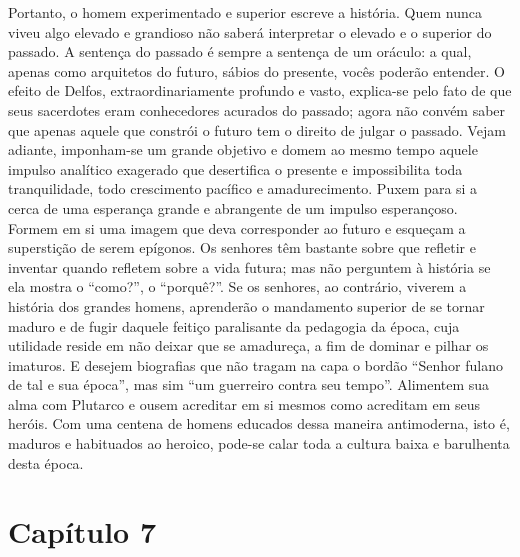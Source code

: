 Portanto, o homem experimentado e superior escreve a história. Quem
nunca viveu algo elevado e grandioso não saberá interpretar o elevado e
o superior do passado. A sentença do passado é sempre a sentença de um
oráculo: a qual, apenas como arquitetos do futuro, sábios do presente,
vocês poderão entender. O efeito de Delfos, extraordinariamente profundo
e vasto, explica-se pelo fato de que seus sacerdotes eram conhecedores
acurados do passado; agora não convém saber que apenas aquele que
constrói o futuro tem o direito de julgar o passado. Vejam adiante,
imponham-se um grande objetivo e domem ao mesmo tempo aquele impulso
analítico exagerado que desertifica o presente e impossibilita toda
tranquilidade, todo crescimento pacífico e amadurecimento. Puxem para si
a cerca de uma esperança grande e abrangente de um impulso esperançoso.
Formem em si uma imagem que deva corresponder ao futuro e esqueçam a
superstição de serem epígonos. Os senhores têm bastante sobre que refletir
e inventar quando refletem sobre a vida futura; mas não perguntem à
história se ela mostra o ``como?'', o ``porquê?''. Se os senhores, ao
contrário, viverem a história dos grandes homens, aprenderão o
mandamento superior de se tornar maduro e de fugir daquele feitiço
paralisante da pedagogia da época, cuja utilidade reside em não deixar
que se amadureça, a fim de dominar e pilhar os imaturos. E desejem
biografias que não tragam na capa o bordão ``Senhor fulano de tal e sua
época'', mas sim ``um guerreiro contra seu tempo''. Alimentem sua alma
com Plutarco e ousem acreditar em si mesmos como acreditam em seus
heróis. Com uma centena de homens educados dessa maneira antimoderna,
isto é, maduros e habituados ao heroico, pode-se calar toda a cultura
baixa e barulhenta desta época.

\chapter{Capítulo 7}\label{capuxedtulo-7}

